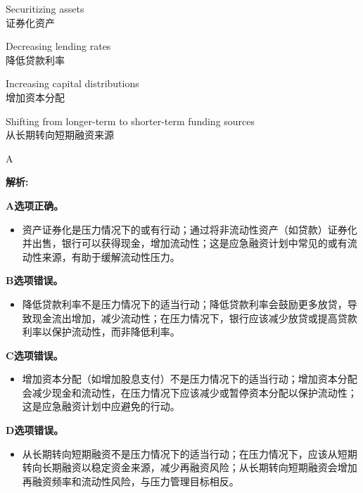 \documentclass{article}
\newenvironment{explanation}
{\textbf{解析:}\par}
{\par}
\begin{document}
\begin{choices}
    \item Securitizing assets\\
    证券化资产
    \item Decreasing lending rates\\
    降低贷款利率
    \item Increasing capital distributions\\
    增加资本分配
    \item Shifting from longer-term to shorter-term funding sources\\
    从长期转向短期融资来源
\end{choices}

\begin{correctanswer}
    A
\end{correctanswer}

\begin{explanation}
    \textbf{A选项正确。}
    \begin{itemize}
        \item 资产证券化是压力情况下的或有行动；通过将非流动性资产（如贷款）证券化并出售，银行可以获得现金，增加流动性；这是应急融资计划中常见的或有流动性来源，有助于缓解流动性压力。
    \end{itemize}

    \textbf{B选项错误。}
    \begin{itemize}
        \item 降低贷款利率不是压力情况下的适当行动；降低贷款利率会鼓励更多放贷，导致现金流出增加，减少流动性；在压力情况下，银行应该减少放贷或提高贷款利率以保护流动性，而非降低利率。
    \end{itemize}

    \textbf{C选项错误。}
    \begin{itemize}
        \item 增加资本分配（如增加股息支付）不是压力情况下的适当行动；增加资本分配会减少现金和流动性，在压力情况下应该减少或暂停资本分配以保护流动性；这是应急融资计划中应避免的行动。
    \end{itemize}

    \textbf{D选项错误。}
    \begin{itemize}
        \item 从长期转向短期融资不是压力情况下的适当行动；在压力情况下，应该从短期转向长期融资以稳定资金来源，减少再融资风险；从长期转向短期融资会增加再融资频率和流动性风险，与压力管理目标相反。
    \end{itemize}
\end{explanation}
\end{document}
